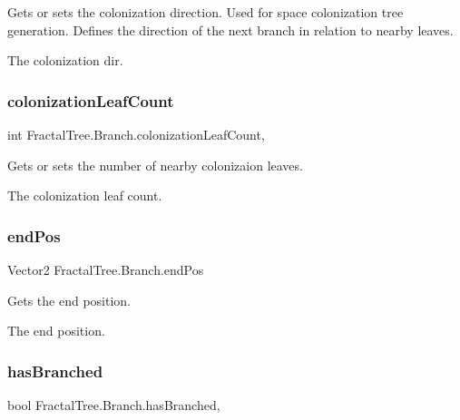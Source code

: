 Gets or sets the colonization direction. Used for space colonization tree generation. Defines the direction of the next branch in relation to nearby leaves. 

The colonization dir.\hypertarget{interface_fractal_tree_1_1_branch_a218b95e107b90de1f7e0587a95c53afc}{}\label{interface_fractal_tree_1_1_branch_a218b95e107b90de1f7e0587a95c53afc} 
\subsubsection{\texorpdfstring{colonization\+Leaf\+Count}{colonizationLeafCount}}
{\footnotesize\ttfamily int Fractal\+Tree.\+Branch.\+colonization\+Leaf\+Count\hspace{0.3cm}{\ttfamily [get]}, {\ttfamily [set]}}



Gets or sets the number of nearby colonizaion leaves. 

The colonization leaf count.\hypertarget{interface_fractal_tree_1_1_branch_a5fb0f25128777e86c137a98958f3072b}{}\label{interface_fractal_tree_1_1_branch_a5fb0f25128777e86c137a98958f3072b} 
\subsubsection{\texorpdfstring{end\+Pos}{endPos}}
{\footnotesize\ttfamily Vector2 Fractal\+Tree.\+Branch.\+end\+Pos\hspace{0.3cm}{\ttfamily [get]}}



Gets the end position. 

The end position.\hypertarget{interface_fractal_tree_1_1_branch_a91cf75bd1bfc1d180be42ee4b461f3e8}{}\label{interface_fractal_tree_1_1_branch_a91cf75bd1bfc1d180be42ee4b461f3e8} 
\subsubsection{\texorpdfstring{has\+Branched}{hasBranched}}
{\footnotesize\ttfamily bool Fractal\+Tree.\+Branch.\+has\+Branched\hspace{0.3cm}{\ttfamily [get]}, {\ttfamily [set]}}




